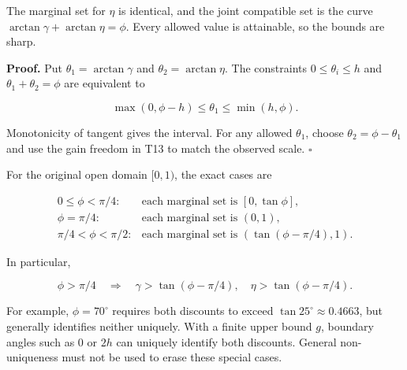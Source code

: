 \documentclass[11pt,a4paper]{article}
\begin{document}
The marginal set for \(\eta\) is identical, and the joint compatible set
is the curve \(\arctan\gamma+\arctan\eta=\phi\). Every allowed value is
attainable, so the bounds are sharp.

\par
\noindent\begin{minipage}{\linewidth}

\textbf{Proof.} Put \(\theta_1=\arctan\gamma\) and
\(\theta_2=\arctan\eta\). The constraints \(0\le\theta_i\le h\) and
\(\theta_1+\theta_2=\phi\) are equivalent to

\[
\max(0,\phi-h)\le\theta_1\le\min(h,\phi).
\]

\end{minipage}\par

Monotonicity of tangent gives the interval. For any allowed
\(\theta_1\), choose \(\theta_2=\phi-\theta_1\) and use the gain freedom
in T13 to match the observed scale. \(\square\)

\par
\noindent\begin{minipage}{\linewidth}

For the original open domain \([0,1)\), the exact cases are

\[
\begin{array}{ll}
0\le\phi<\pi/4:
&\text{each marginal set is }[0,\tan\phi],\\
\phi=\pi/4:
&\text{each marginal set is }(0,1),\\
\pi/4<\phi<\pi/2:
&\text{each marginal set is }(\tan(\phi-\pi/4),1).
\end{array}
\]

\end{minipage}\par

\par
\noindent\begin{minipage}{\linewidth}

In particular,

\[
\boxed{\phi>\pi/4\quad\Longrightarrow\quad
\gamma>\tan(\phi-\pi/4),\quad
\eta>\tan(\phi-\pi/4).}
\]

\end{minipage}\par

For example, \(\phi=70^\circ\) requires both discounts to exceed
\(\tan25^\circ\approx0.4663\), but generally identifies neither
uniquely. With a finite upper bound \(g\), boundary angles such as \(0\)
or \(2h\) can uniquely identify both discounts. General non-uniqueness
must not be used to erase these special cases.
\end{document}

